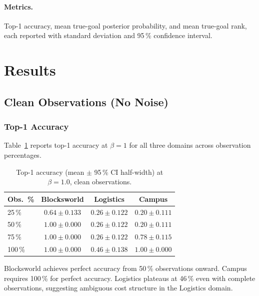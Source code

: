 \documentclass[11pt,a4paper]{article}
\begin{document}
\paragraph{Metrics.}  Top-1 accuracy, mean true-goal posterior probability,
and mean true-goal rank, each reported with standard deviation and 95\,\%
confidence interval.

\section{Results}

\subsection{Clean Observations (No Noise)}

\subsubsection{Top-1 Accuracy}

Table~\ref{tab:clean_accuracy} reports top-1 accuracy at $\beta = 1$ for all
three domains across observation percentages.

\begin{table}[H]
\centering
\caption{Top-1 accuracy (mean $\pm$ 95\,\% CI half-width) at $\beta = 1.0$,
         clean observations.}
\label{tab:clean_accuracy}
\begin{tabular}{lccc}
\toprule
\textbf{Obs.\ \%} & \textbf{Blocksworld} & \textbf{Logistics} & \textbf{Campus} \\
\midrule
25\,\%  & $0.64 \pm 0.133$ & $0.26 \pm 0.122$ & $0.20 \pm 0.111$ \\
50\,\%  & $1.00 \pm 0.000$ & $0.26 \pm 0.122$ & $0.20 \pm 0.111$ \\
75\,\%  & $1.00 \pm 0.000$ & $0.26 \pm 0.122$ & $0.78 \pm 0.115$ \\
100\,\% & $1.00 \pm 0.000$ & $0.46 \pm 0.138$ & $1.00 \pm 0.000$ \\
\bottomrule
\end{tabular}
\end{table}

Blocksworld achieves perfect accuracy from 50\,\% observations onward.
Campus requires 100\,\% for perfect accuracy.  Logistics plateaus at
46\,\% even with complete observations, suggesting ambiguous cost
structure in the Logistics domain.
\end{document}
